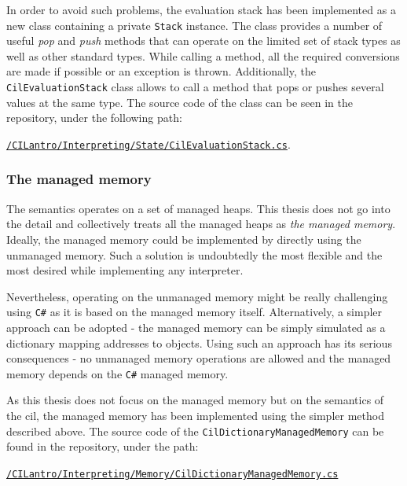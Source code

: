 \documentclass{article}
\numberwithin{equation}{section}
\begin{document}
In order to avoid such problems, the evaluation stack has been implemented as a new class containing a private \texttt{Stack} instance. The class provides a number of useful \textit{pop} and \textit{push} methods that can operate on the limited set of stack types as well as other standard types. While calling a method, all the required conversions are made if possible or an exception is thrown. Additionally, the \texttt{CilEvaluationStack} class allows to call a method that pops or pushes several values at the same type. The source code of the class can be seen in the repository, under the following path: 
\begin{center}
\href{https://github.com/kvasnyk/CILantro/blob/master/CILantro/CILantro/Interpreting/State/CilEvaluationStack.cs}{\texttt{/CILantro/Interpreting/State/CilEvaluationStack.cs}}.
\end{center}

\subsubsection{The managed memory}
\label{sec:managedMemory}

The semantics operates on a set of managed heaps. This thesis does not go into the detail and collectively treats all the managed heaps as \textit{the managed memory}. Ideally, the managed memory could be implemented by directly using the unmanaged memory. Such a solution is undoubtedly the most flexible and the most desired while implementing any interpreter.

Nevertheless, operating on the unmanaged memory might be really challenging using \texttt{C\#} as it is based on the managed memory itself. Alternatively, a simpler approach can be adopted - the managed memory can be simply simulated as a dictionary mapping addresses to objects. Using such an approach has its serious consequences - no unmanaged memory operations are allowed and the managed memory depends on the \texttt{C\#} managed memory.

As this thesis does not focus on the managed memory but on the semantics of the \acrshort{cil}, the managed memory has been implemented using the simpler method described above. The source code of the \texttt{CilDictionaryManagedMemory} can be found in the repository, under the path:
\begin{center}
	\href{https://github.com/kvasnyk/CILantro/blob/master/CILantro/CILantro/Interpreting/Memory/CilDictionaryManagedMemory.cs}{\texttt{/CILantro/Interpreting/Memory/CilDictionaryManagedMemory.cs}}
\end{center}
\end{document}
